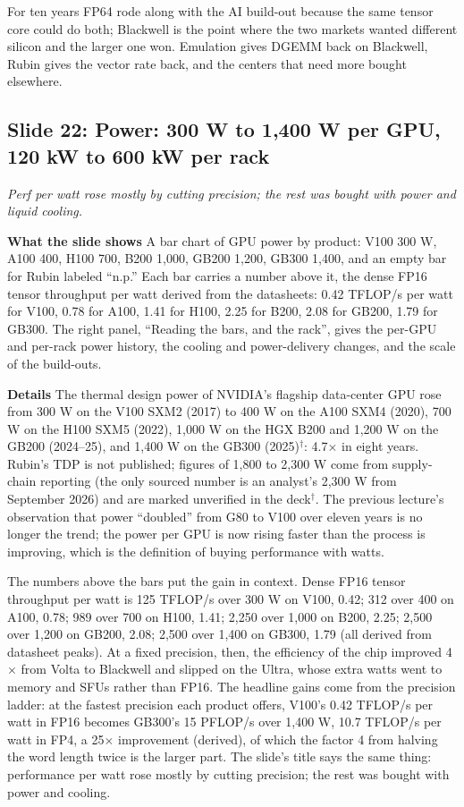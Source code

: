 \documentclass[11pt,letterpaper]{article}
\newcommand{\slide}[3]{%
  \subsection[Slide #1: #2]{Slide #1: #2}%
  {\color{muted}\itshape #3\par}\medskip}
\newcommand{\para}[1]{\medskip\noindent\textbf{#1}\quad}
\newenvironment{intuition}{\begin{tcolorbox}[intuitionbox]}{\end{tcolorbox}}
\begin{document}
\begin{intuition}
For ten years FP64 rode along with the AI build-out because the same tensor core could do both; Blackwell is the point where the two markets wanted different silicon and the larger one won. Emulation gives DGEMM back on Blackwell, Rubin gives the vector rate back, and the centers that need more bought elsewhere.
\end{intuition}


\slide{22}{Power: 300 W to 1,400 W per GPU, 120 kW to 600 kW per rack}{Perf per watt rose mostly by cutting precision; the rest was bought with power and liquid cooling.}

\para{What the slide shows} A bar chart of GPU power by product: V100 300 W, A100 400, H100 700, B200 1{,}000, GB200 1{,}200, GB300 1{,}400, and an empty bar for Rubin labeled ``n.p.'' Each bar carries a number above it, the dense FP16 tensor throughput per watt derived from the datasheets: 0.42 TFLOP/s per watt for V100, 0.78 for A100, 1.41 for H100, 2.25 for B200, 2.08 for GB200, 1.79 for GB300. The right panel, ``Reading the bars, and the rack'', gives the per-GPU and per-rack power history, the cooling and power-delivery changes, and the scale of the build-outs.

\para{Details} The thermal design power of NVIDIA's flagship data-center GPU rose from 300 W on the V100 SXM2 (2017) to 400 W on the A100 SXM4 (2020), 700 W on the H100 SXM5 (2022), 1{,}000 W on the HGX B200 and 1{,}200 W on the GB200 (2024--25), and 1{,}400 W on the GB300 (2025)$^\dagger$: 4.7$\times$ in eight years. Rubin's TDP is not published; figures of 1{,}800 to 2{,}300 W come from supply-chain reporting (the only sourced number is an analyst's 2{,}300 W from September 2026) and are marked unverified in the deck$^\dagger$. The previous lecture's observation that power ``doubled'' from G80 to V100 over eleven years is no longer the trend; the power per GPU is now rising faster than the process is improving, which is the definition of buying performance with watts.

The numbers above the bars put the gain in context. Dense FP16 tensor throughput per watt is 125 TFLOP/s over 300 W on V100, 0.42; 312 over 400 on A100, 0.78; 989 over 700 on H100, 1.41; 2{,}250 over 1{,}000 on B200, 2.25; 2{,}500 over 1{,}200 on GB200, 2.08; 2{,}500 over 1{,}400 on GB300, 1.79 (all derived from datasheet peaks). At a fixed precision, then, the efficiency of the chip improved 4$\times$ from Volta to Blackwell and slipped on the Ultra, whose extra watts went to memory and SFUs rather than FP16. The headline gains come from the precision ladder: at the fastest precision each product offers, V100's 0.42 TFLOP/s per watt in FP16 becomes GB300's 15 PFLOP/s over 1{,}400 W, 10.7 TFLOP/s per watt in FP4, a 25$\times$ improvement (derived), of which the factor 4 from halving the word length twice is the larger part. The slide's title says the same thing: performance per watt rose mostly by cutting precision; the rest was bought with power and cooling.
\end{document}
